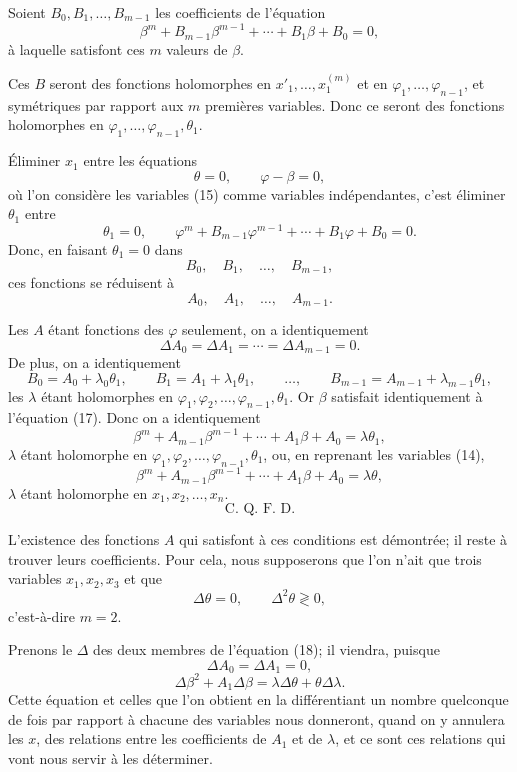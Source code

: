 \documentclass[11pt]{article}
\begin{document}
Soient $B_0,B_1,\ldots,B_{m-1}$ les coefficients de l’équation
\begin{equation*}\tag{17}
\beta^m+B_{m-1}\beta^{m-1}+\cdots+B_1\beta+B_0=0,
\end{equation*}
à laquelle satisfont ces $m$ valeurs de $\beta$.

Ces $B$ seront des fonctions holomorphes en $x'_1,\ldots,x_1^{(m)}$ et en $\varphi_1,\ldots,\varphi_{n-1}$, et symétriques par rapport aux $m$ premières variables. Donc ce seront des fonctions holomorphes en $\varphi_1,\ldots,\varphi_{n-1},\theta_1$.

Éliminer $x_1$ entre les équations
\[
\theta=0,\qquad \varphi-\beta=0,
\]
où l’on considère les variables (15) comme variables indépendantes, c’est éliminer $\theta_1$ entre
\[
\theta_1=0,
\qquad
\varphi^m+B_{m-1}\varphi^{m-1}+\cdots+B_1\varphi+B_0=0.
\]
Donc, en faisant $\theta_1=0$ dans
\[
B_0,\quad B_1,\quad \ldots,\quad B_{m-1},
\]
ces fonctions se réduisent à
\[
A_0,\quad A_1,\quad \ldots,\quad A_{m-1}.
\]

Les $A$ étant fonctions des $\varphi$ seulement, on a identiquement
\[
\Delta A_0=\Delta A_1=\cdots=\Delta A_{m-1}=0.
\]
De plus, on a identiquement
\[
B_0=A_0+\lambda_0\theta_1,\qquad
B_1=A_1+\lambda_1\theta_1,\qquad
\ldots,\qquad
B_{m-1}=A_{m-1}+\lambda_{m-1}\theta_1,
\]
les $\lambda$ étant holomorphes en $\varphi_1,\varphi_2,\ldots,\varphi_{n-1},\theta_1$. Or $\beta$ satisfait identiquement à l’équation (17). Donc on a identiquement
\[
\beta^m+A_{m-1}\beta^{m-1}+\cdots+A_1\beta+A_0=\lambda\theta_1,
\]
$\lambda$ étant holomorphe en $\varphi_1,\varphi_2,\ldots,\varphi_{n-1},\theta_1$, ou, en reprenant les variables (14),
\begin{equation*}\tag{18}
\beta^m+A_{m-1}\beta^{m-1}+\cdots+A_1\beta+A_0=\lambda\theta,
\end{equation*}
$\lambda$ étant holomorphe en $x_1,x_2,\ldots,x_n$.
\[
\text{C. Q. F. D.}
\]

L’existence des fonctions $A$ qui satisfont à ces conditions est démontrée; il reste à trouver leurs coefficients. Pour cela, nous supposerons que l’on n’ait que trois variables $x_1,x_2,x_3$ et que
\[
\Delta\theta=0,\qquad \Delta^2\theta\gtrless0,
\]
c’est-à-dire $m=2$.

Prenons le $\Delta$ des deux membres de l’équation (18); il viendra, puisque
\[
\Delta A_0=\Delta A_1=0,
\]
\begin{equation*}\tag{19}
\Delta\beta^2+A_1\Delta\beta=\lambda\Delta\theta+\theta\Delta\lambda.
\end{equation*}
Cette équation et celles que l’on obtient en la différentiant un nombre quelconque de fois par rapport à chacune des variables nous donneront, quand on y annulera les $x$, des relations entre les coefficients de $A_1$ et de $\lambda$, et ce sont ces relations qui vont nous servir à les déterminer.
\end{document}
